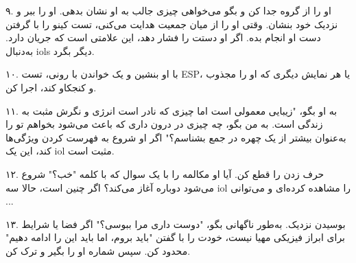 ۹. او را از گروه جدا کن و بگو می‌خواهی چیزی جالب به او نشان بدهی. او را ببر و نزدیک خود بنشان. وقتی او را از میان جمعیت هدایت می‌کنی، تست کینو را با گرفتن دست او انجام بده. اگر او دستت را فشار دهد، این علامتی است که جریان دارد. به‌دنبال iols دیگر بگرد.

۱۰. با او بنشین و یک خواندن با رونی، تست ESP، یا هر نمایش دیگری که او را مجذوب و کنجکاو کند، اجرا کن.

۱۱. به او بگو، "زیبایی معمولی است اما چیزی که نادر است انرژی و نگرش مثبت به زندگی است. به من بگو، چه چیزی در درون داری که باعث می‌شود بخواهم تو را به‌عنوان بیشتر از یک چهره در جمع بشناسم؟" اگر او شروع به فهرست کردن ویژگی‌ها کند، این یک iol مثبت است.

۱۲. حرف زدن را قطع کن. آیا او مکالمه را با یک سوال که با کلمه "خب؟" شروع می‌شود دوباره آغاز می‌کند؟ اگر چنین است، حالا سه iol را مشاهده کرده‌ای و می‌توانی ...

۱۳. بوسیدن نزدیک. به‌طور ناگهانی بگو، "دوست داری مرا ببوسی؟" اگر فضا یا شرایط برای ابراز فیزیکی مهیا نیست، خودت را با گفتن "باید بروم، اما باید این را ادامه دهیم" محدود کن. سپس شماره او را بگیر و ترک کن.